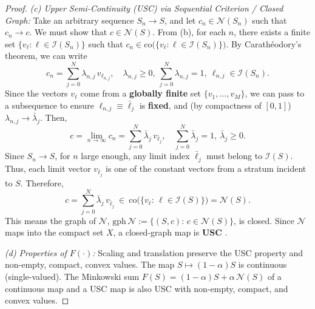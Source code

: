 \documentclass[11pt]{article}
\newenvironment{IEEEproof}{\begin{proof}}{\end{proof}}
\begin{document}
\begin{IEEEproof}
\textit{(c) Upper Semi-Continuity (USC) via Sequential Criterion / Closed Graph:}
Take an arbitrary sequence $S_n\to S$, and let $c_n\in\mathcal N(S_n)$ such that $c_n\to c$. We must show that $c\in\mathcal N(S)$. From (b), for each $n$, there exists a finite set $\{v_{\ell}: \ell\in\mathcal I(S_n)\}$ such that $c_n\in\mathrm{co}\big(\{v_{\ell}:\ell\in\mathcal I(S_n)\}\big)$. By Carathéodory's theorem, we can write
\begin{equation}
c_n=\sum_{j=0}^{N} \lambda_{n,j}\, v_{\ell_{n,j}},\quad 
\lambda_{n,j}\ge 0,\ \sum_{j=0}^{N}\lambda_{n,j}=1,\ 
\ell_{n,j}\in\mathcal I(S_n).
\end{equation}
Since the vectors $v_{\ell}$ come from a \textbf{globally finite} set $\{v_1,\dots,v_M\}$, we can pass to a subsequence to ensure $\ell_{n,j}\equiv \bar\ell_j$ is \textbf{fixed}, and (by compactness of $[0,1]$) $\lambda_{n,j}\to \bar\lambda_j$. Then,
\begin{equation}
c=\lim_{n\to\infty} c_n=\sum_{j=0}^{N}\bar\lambda_j\, v_{\bar\ell_j},
\quad\sum_{j=0}^{N}\bar\lambda_j=1,\ \bar\lambda_j\ge 0.
\end{equation}
Since $S_n\to S$, for $n$ large enough, any limit index $\bar\ell_j$ must belong to $\mathcal I(S)$. Thus, each limit vector $v_{\bar\ell_j}$ is one of the constant vectors from a stratum incident to $S$. Therefore,
\begin{equation}
c=\sum_{j=0}^{N}\bar\lambda_j\, v_{\bar\ell_j}\ \in\ 
\mathrm{co}\big(\{v_\ell:\,\ell\in\mathcal I(S)\}\big)=\mathcal N(S).
\end{equation}
This means the graph of $\mathcal N$, $\mathrm{gph}\,\mathcal N:=\{(S,c):\,c\in\mathcal N(S)\}$, is closed. Since $\mathcal{N}$ maps into the compact set $X$, a closed-graph map is \textbf{USC} \cite{Aubin1984Differential}.

\textit{(d) Properties of $F(\cdot)$:}
Scaling and translation preserve the USC property and non-empty, compact, convex values. The map $S\mapsto (1-\alpha)S$ is continuous (single-valued). The Minkowski sum $F(S)=(1-\alpha)S+\alpha\,\mathcal N(S)$ of a continuous map and a USC map is also USC with non-empty, compact, and convex values.
\end{IEEEproof}
\end{document}
